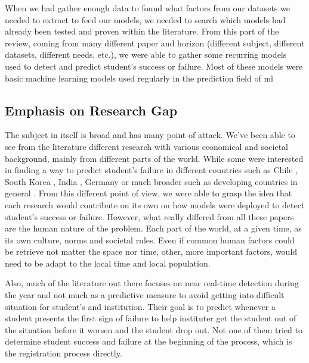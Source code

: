 \documentclass[../main.tex]{subfiles}
\begin{document}
When we had gather enough data to found what factors from our datasets we needed to extract to feed our models, we needed to search which models had already been tested and proven within the literature. 
From this part of the review, coming from many different paper and horizon (different subject, different datasets, different needs, etc.), we were able to gather some recurring models used to detect and predict student's success or failure. Most of these models were basic machine learning models used regularly in the prediction field of \acrshort{ml}

\subsection{Emphasis on Research Gap}
The subject in itself is broad and has many point of attack. We've been able to see from the literature different research with various economical and societal background, mainly from different parts of the world.  
While some were interested in finding a way to predict student's failure in different countries such as Chile \cite{ramirez_prediction_2018, opazo_analysis_2021}, South Korea \cite{lee_machine_2019}, India \cite{mardolkar_forecasting_2020}, Germany \cite{berens_early_2018} or much broader such as developing countries in general \cite{mduma_survey_2019, mduma_machine_2019}. 
From this different point of view, we were able to grasp the idea that each research would contribute on its own on how models were deployed to detect student's success or failure. However, what really differed from all these papers are the human nature of the problem. Each part of the world, at a given time, as its own culture, norms and societal rules. Even if common human factors could be retrieve not matter the space nor time, other, more important factors, would need to be adapt to the local time and local population. 

Also, much of the literature out there focuses on near real-time detection during the year and not much as a predictive measure to avoid getting into difficult situation for student's and institution. Their goal is to predict whenever a student presents the first sign of failure to help instituter get the student out of the situation before it worsen and the student drop out.
Not one of them tried to determine student success and failure at the beginning of the process, which is the registration process directly.
\end{document}
